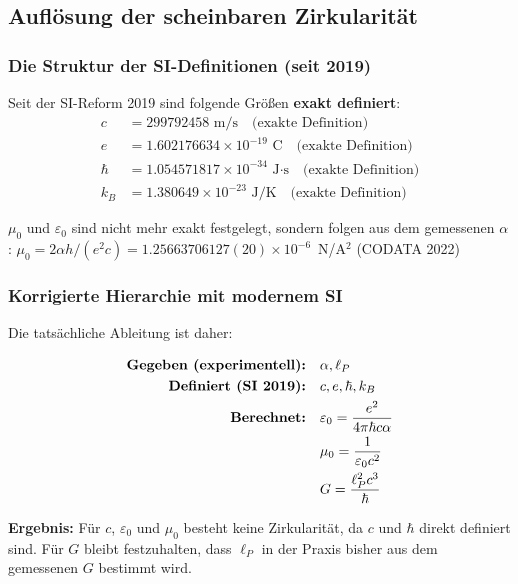 	\subsection{Auflösung der scheinbaren Zirkularität}
	
	\subsubsection{Die Struktur der SI-Definitionen (seit 2019)}
	
	\begin{tcolorbox}[colback=green!5!white,colframe=green!75!black,title=Moderne SI-Basis]
		Seit der SI-Reform 2019 sind folgende Größ{}en \textbf{exakt definiert}:
		\begin{align}
			c &= 299792458 \text{ m/s} \quad \text{(exakte Definition)}\\
			e &= 1.602176634 \times 10^{-19} \text{ C} \quad \text{(exakte Definition)}\\
			\hbar &= 1.054571817 \times 10^{-34} \text{ J·s} \quad \text{(exakte Definition)}\\
			k_B &= 1.380649 \times 10^{-23} \text{ J/K} \quad \text{(exakte Definition)}
		\end{align}
		
		$\mu_0$ und $\varepsilon_0$ sind nicht mehr exakt festgelegt, sondern folgen aus dem gemessenen $\alpha$: $\mu_0 = 2\alpha h/(e^2 c) = 1.25663706127(20)\times10^{-6}$~N/A$^2$ (CODATA 2022)
	\end{tcolorbox}
	
	\subsubsection{Korrigierte Hierarchie mit modernem SI}
	
	Die tatsächliche Ableitung ist daher:
	
	\begin{align}
		\text{\textbf{Gegeben (experimentell):}} &\quad \alpha, \ell_P\\
		\text{\textbf{Definiert (SI 2019):}} &\quad c, e, \hbar, k_B\\
		\text{\textbf{Berechnet:}} &\quad \varepsilon_0 = \frac{e^2}{4\pi\hbar c \alpha}\\
		&\quad \mu_0 = \frac{1}{\varepsilon_0 c^2}\\
		&\quad G = \frac{\ell_P^2 c^3}{\hbar}
	\end{align}
	
	\textbf{Ergebnis:} Für $c$, $\varepsilon_0$ und $\mu_0$ besteht keine Zirkularität, da $c$ und $\hbar$ direkt definiert sind. Für $G$ bleibt festzuhalten, dass $\ell_P$ in der Praxis bisher aus dem gemessenen $G$ bestimmt wird.
	
